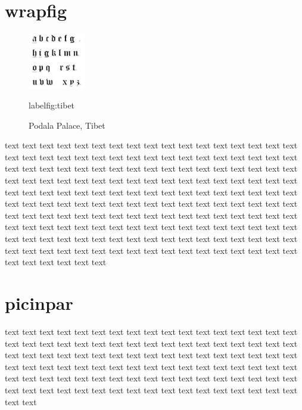 \documentclass{article}
\begin{document}
\section{wrapfig}

\begin{figure}
\includegraphics[width=2.5cm]{figures/abc.jpeg}
\caption{Podala Palace, Tibet}label{fig:tibet}
\end{figure}
text text text text text text text text
text text text text text text text text
text text text text text text text text 
text text text text text text text text
text text text text text text text text
text text text text text text text text
text text text text text text text text
text text text text text text text text
text text text text text text text text
text text text text text text text text
text text text text text text text text
text text text text text text text text
text text text text text text text text
text text text text text text text text
text text text text text text text text
text text text text text text text text
text text text text text text text text
text text text text text text text text
text text text text text text text text
text text text text text text text text
text text text text text text text text
text text text text text text text text


\section{picinpar}%

\begin{figwindow}
text text text text text text text text
text text text text text text text text
text text text text text text text text 
text text text text text text text text
text text text text text text text text
text text text text text text text text
text text text text text text text text
text text text text text text text text
text text text text text text text text
text text text text text text text text
text text text text text text text text
text text text text text text text text
text text text text text text text text
\end{figwindow}
\end{document}
